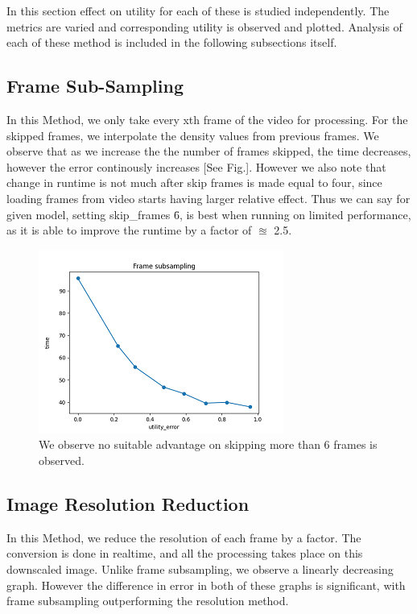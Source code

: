 \documentclass[conference]{IEEEtran}
\begin{document}
In this section effect on utility for each of these is studied independently. The metrics are varied and corresponding 
utility is observed and plotted. Analysis of each of these method is included in the following subsections itself.

\subsection{Frame Sub-Sampling}

In this Method, we only take every xth frame of the video for processing. For the skipped frames, we interpolate 
the density values from previous frames. We observe that as we increase the the number of frames skipped, the time decreases, however the error continously increases [See Fig.].
However we also note that change in runtime is not much after skip frames is made equal to four, since loading frames from video starts having larger relative effect.
Thus we can say for given model, setting skip\_frames \= 6, is best 
when running on limited performance, as it is able to improve the runtime by a factor of $\approxeq$ 2.5.

\begin{figure}[htbp]
\centerline{\includegraphics{plots/plot_skip_frames_eVt.png}}
\caption{We observe no suitable advantage on skipping more than 6 frames is observed.}
\label{skf_evt} 
\end{figure}


\subsection{Image Resolution Reduction}

In this Method, we reduce the resolution of each frame by a factor. The conversion is done in realtime, and all the processing takes place on this downscaled image.
Unlike frame subsampling, we observe a linearly decreasing graph. However the difference in error in both of these graphs is significant, with frame subsampling outperforming the resolution method.
\end{document}
